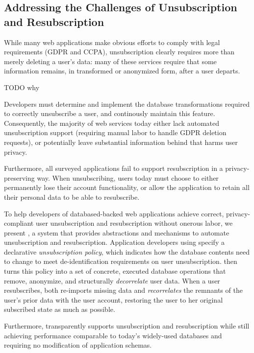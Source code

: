 \subsection{Addressing the Challenges of Unsubscription and Resubscription}

While many web applications make obvious efforts to comply with legal requirements (GDPR and CCPA), 
unsubscription clearly requires more than merely deleting a user's data: many of these services
require that some information remains, in transformed or anonymized form, after a user departs.

TODO why

%
Developers must determine and implement the database transformations required to
correctly unsubscribe a user, and continously maintain this feature.
%
Consequently, the majority of web services today either lack automated unsubscription support
(requiring manual labor to handle \eg GDPR deletion requests), or potentially leave substantial
information behind that harms user privacy.

Furthermore, all surveyed applications fail to support resubscription in a privacy-preserving way.
When unsubscribing, users today must choose to either permanently lose their account functionality,
or allow the application to retain all their personal data to be able to resubscribe.

To help developers of databased-backed web applications achieve correct,
privacy-compliant user unsubscription and resubscription without onerous labor, we present 
\sys, a system that provides abstractions and mechanisms to automate unsubscription and
resubscription.
%
Application developers using \sys specify a declarative \emph{unsubscription policy},
which indicates how the database contents need to change to meet de-identification
requirements on user unsubscription.
%
\sys then turns this policy into a set of concrete, executed database operations that remove,
anonymize, and structurally \emph{decorrelate} user data.
%
When a user resubscribes, \sys both re-imports missing data and
\emph{recorrelates} the remnants of the user's prior data with the user account,
restoring the user to her original subscribed state as much as possible.

Furthermore, \sys transparently supports unsubscription and resubscription while still achieving performance
comparable to today’s widely-used databases and requiring no modification of application schemas.

